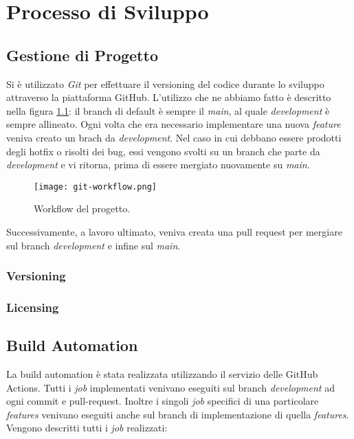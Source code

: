 \chapter{Processo di Sviluppo}

\section{Gestione di Progetto}
Si è utilizzato \textit{Git} per effettuare il versioning del codice durante lo sviluppo attraverso la piattaforma GitHub.
L’utilizzo che ne abbiamo fatto è descritto nella figura \ref{pic:workflow}: il branch di default è sempre il \textit{main}, al quale \textit{development} è sempre allineato. Ogni volta che era necessario implementare una nuova \textit{feature} veniva creato un brach da \textit{development}. Nel caso in cui debbano essere prodotti degli hotfix o risolti dei bug, essi vengono svolti su un branch che parte da \textit{development} e vi ritorna, prima di essere mergiato nuovamente su \textit{main}.

\begin{figure}[ht]
    \texttt{[image: git-workflow.png]}
    \centering
    \caption{\label{pic:workflow}Workflow del progetto.}
\end{figure}

 Successivamente, a lavoro ultimato, veniva creata una pull request per mergiare sul branch \textit{development} e infine sul \textit{main}.

\subsection{Versioning}
\subsection{Licensing}

\section{Build Automation}
La build automation è stata realizzata utilizzando il servizio delle GitHub Actions. Tutti i \textit{job} implementati venivano eseguiti sul branch \textit{development} ad ogni commit e pull-request. Inoltre i singoli \textit{job} specifici di una particolare \textit{features} venivano eseguiti anche sul branch di implementazione di quella \textit{features}. Vengono descritti tutti i \textit{job} realizzati:

